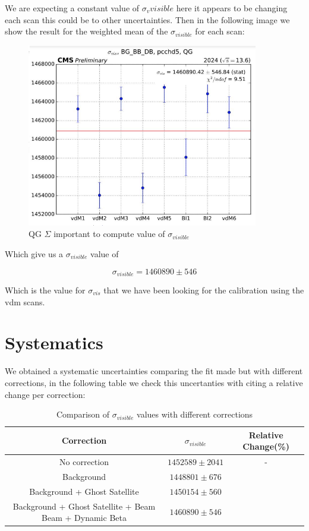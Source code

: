 We are expecting a constant value of $\sigma_v{visible}$ here it appears to be changing each scan this could be to other uncertainties. Then in the following image we show the result for the weighted mean of the $\sigma_{visible}$ for each scan: 

\begin{figure}[H]
    \centering
    \includegraphics[width=0.9\textwidth]{sigscan.png}
    \caption{QG $\Sigma$ important to compute value of $\sigma_{visible}$}
    \label{fig:sigscan}
\end{figure}

Which give us a $\sigma_{visible}$ value of 

\begin{equation}
\sigma_{visible} = 1460890 \pm 546
\end{equation}

Which is the value for $\sigma_{vis}$ that we have been looking for the calibration using the vdm scans. 

\newpage


\section{Systematics}


We obtained a systematic uncertainties comparing the fit made but with different corrections, in the following table we check this uncertanties with citing a relative change per correction:

\begin{table}[H]
\begin{center}
\small
\begin{tabular}{|c c c|} 
 \hline
 Correction & $\sigma_{visible}$ & Relative Change(\%) \\ [0.5ex] 
 \hline\hline
 No correction & $1452589 \pm 2041$ & - \\ 
 \hline
 Background & $1448801 \pm 676$ & \\
 \hline
 Background + Ghost Satellite & $1450154 \pm 560$ & \\
 \hline
 Background + Ghost Satellite + Beam Beam + Dynamic Beta & $1460890 \pm 546$ & \\ [1.0ex]
 \hline
\end{tabular}
\caption{Comparison of $\sigma_{visible}$ values with different corrections}
\end{center}
\end{table}
